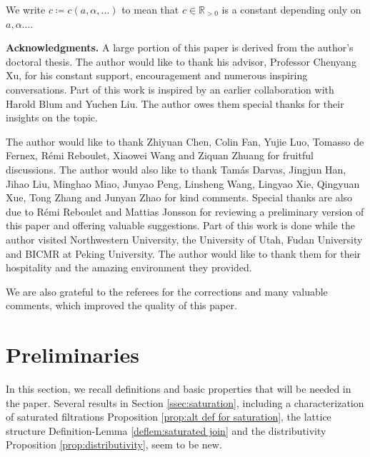 \documentclass[11pt, leqno]{amsart}%
\theoremstyle{plain}
\theoremstyle{definition}
\theoremstyle{remark}
\newcommand{\bR}{\mathbb{R}}
\newcommand{\fm}{\mathfrak{m}}
\newcommand{\Spec}{\mathrm{Spec}}
\numberwithin{equation}{section}
\begin{document}
We write $c\coloneqq c(a,\alpha,\ldots)$ to mean that $c\in\bR_{>0}$ is a constant depending only on $a,\alpha\ldots$. 



\bigskip

\noindent\textbf{Acknowledgments.} 
    A large portion of this paper is derived from the author's doctoral thesis. The author would like to thank his advisor, Professor Chenyang Xu, for his constant support, encouragement and numerous inspiring conversations. Part of this work is inspired by an earlier collaboration with Harold Blum and Yuchen Liu. The author owes them special thanks for their insights on the topic. 

    The author would like to thank Zhiyuan Chen, Colin Fan, Yujie Luo, Tomasso de Fernex, R\'emi Reboulet, Xiaowei Wang and Ziquan Zhuang for fruitful discussions. The author would also like to thank Tam\'as Darvas, Jingjun Han, Jihao Liu, Minghao Miao, Junyao Peng, Linsheng Wang, Lingyao Xie, Qingyuan Xue, Tong Zhang and Junyan Zhao for kind comments. Special thanks are also due to R\'emi Reboulet and Mattias Jonsson for reviewing a preliminary version of this paper and offering valuable suggestions. Part of this work is done while the author visited Northwestern University, the University of Utah, Fudan University and BICMR at Peking University. The author would like to thank them for their hospitality and the amazing environment they provided.

    We are also grateful to the referees for the corrections and many valuable comments, which improved the quality of this paper.  







\section{Preliminaries}\label{sec:prelim}


In this section, we recall definitions and basic properties that will be needed in the paper. Several results in Section \ref{ssec:saturation}, including a characterization of saturated filtrations Proposition \ref{prop:alt def for saturation}, the lattice structure Definition-Lemma \ref{deflem:saturated join} and the distributivity Proposition \ref{prop:distributivity}, seem to be new.
\end{document}
